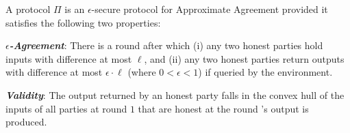 \begin{definition}
    \label{def:approximate-agreement}
    A protocol $\Pi$ is an $\epsilon$-secure protocol for Approximate Agreement provided it satisfies the following two properties:
    \begin{cccItemize}[nosep]
        \item \emph{\textbf{$\epsilon$-Agreement}}: There is a round after which (i) any two honest parties hold inputs with difference at most $\ell$, and (ii) any two honest parties return outputs with difference at most $\epsilon \cdot \ell$ (where $0 < \epsilon < 1$) if queried by the environment.

        \item \emph{\textbf{Validity}}: The output returned by an honest party \party falls in the convex hull of the inputs of all parties at round $1$ that are honest at the round \party's output is produced.
    \end{cccItemize}
\end{definition}
